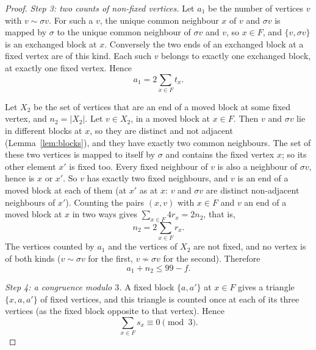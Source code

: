 \documentclass[11pt,a4paper]{article}
\theoremstyle{definition}
\theoremstyle{remark}
\newcommand{\sg}{\sigma}
\begin{document}
\begin{proof}
\medskip\noindent\emph{Step 3: two counts of non-fixed vertices.}
Let $a_1$ be the number of vertices $v$ with $v\sim\sg v$. For such a $v$, the unique common neighbour $x$ of $v$
and $\sg v$ is mapped by $\sg$ to the unique common neighbour of $\sg v$ and $v$, so $x\in F$, and $\{v,\sg v\}$ is
an exchanged block at $x$. Conversely the two ends of an exchanged block at a fixed vertex are of this kind. Each
such $v$ belongs to exactly one exchanged block, at exactly one fixed vertex. Hence
\begin{equation}\label{eq:a1}
a_1=2\sum_{x\in F}t_x .
\end{equation}

Let $X_2$ be the set of vertices that are an end of a moved block at some fixed vertex, and $n_2=|X_2|$. Let
$v\in X_2$, in a moved block at $x\in F$. Then $v$ and $\sg v$ lie in different blocks at $x$, so they are distinct
and not adjacent (Lemma~\ref{lem:blocks}), and they have exactly two common neighbours. The set of these two
vertices is mapped to itself by $\sg$ and contains the fixed vertex $x$; so its other element $x'$ is fixed too.
Every fixed neighbour of $v$ is also a neighbour of $\sg v$, hence is $x$ or $x'$. So $v$ has exactly two fixed
neighbours, and $v$ is an end of a moved block at each of them (at $x'$ as at $x$: $v$ and $\sg v$ are distinct
non-adjacent neighbours of $x'$). Counting the pairs $(x,v)$ with $x\in F$ and $v$ an end of a moved block at $x$ in
two ways gives $\sum_{x\in F}4r_x=2n_2$, that is,
\begin{equation}\label{eq:n2}
n_2=2\sum_{x\in F}r_x .
\end{equation}
The vertices counted by $a_1$ and the vertices of $X_2$ are not fixed, and no vertex is of both kinds
($v\sim\sg v$ for the first, $v\not\sim\sg v$ for the second). Therefore
\begin{equation}\label{eq:a1n2}
a_1+n_2\le 99-f .
\end{equation}

\medskip\noindent\emph{Step 4: a congruence modulo $3$.}
A fixed block $\{a,a'\}$ at $x\in F$ gives a triangle $\{x,a,a'\}$ of fixed vertices, and this triangle is counted
once at each of its three vertices (as the fixed block opposite to that vertex). Hence
\begin{equation}\label{eq:mod3}
\sum_{x\in F}s_x\equiv0\pmod3 .
\end{equation}


\end{proof}
\end{document}
